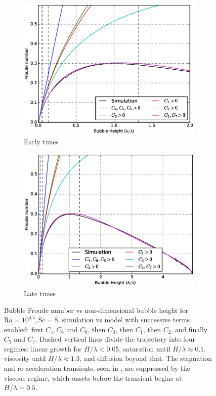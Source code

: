 \begin{figure}
\begin{subfigure}[b]{\columnwidth}
\includegraphics[width=\columnwidth]{figs/Cascade-short-32-4}
\caption{Early times}
\end{subfigure}
\begin{subfigure}[b]{\columnwidth}
\includegraphics[width=\columnwidth]{figs/Cascade-32-4}
\caption{Late times}
\end{subfigure}
\caption{ 
Bubble Froude number vs non-dimensional bubble height for $\text{Ra} = 10^{4.5}, \text{Sc} = 8$, simulation vs model with successive terms enabled: first $C_4, C_6$ and $C_8$, then $C_3$, then $C_1$, then $C_2$, and finally $C_5$ and $C_7$.
Dashed vertical lines divide the trajectory into four regimes: linear growth for $H/\lambda < 0.05$, saturation until $H / \lambda \approx 0.1$, viscosity until $H / \lambda \approx 1.3$, and diffusion beyond that.
The stagnation and re-acceleration transients, seen in , are suppressed by the viscous regime, which onsets before the transient begins at $H / \lambda = 0.5$.
}
\end{figure}

